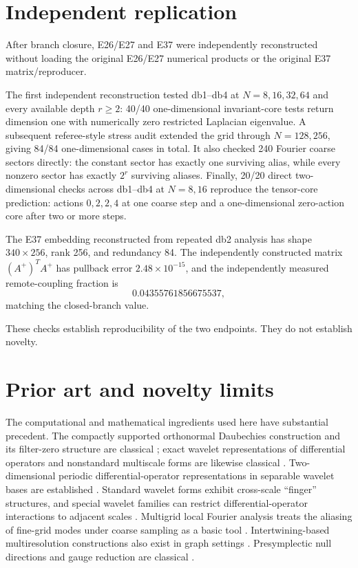 \documentclass[11pt,a4paper]{article}
\begin{document}
\section{Independent replication}
After branch closure, E26/E27 and E37 were independently reconstructed without loading the original E26/E27 numerical products or the original E37 matrix/reproducer.

The first independent reconstruction tested db1--db4 at $N=8,16,32,64$ and every available depth $r\ge2$: 40/40 one-dimensional invariant-core tests return dimension one with numerically zero restricted Laplacian eigenvalue. A subsequent referee-style stress audit extended the grid through $N=128,256$, giving 84/84 one-dimensional cases in total. It also checked 240 Fourier coarse sectors directly: the constant sector has exactly one surviving alias, while every nonzero sector has exactly $2^r$ surviving aliases. Finally, 20/20 direct two-dimensional checks across db1--db4 at $N=8,16$ reproduce the tensor-core prediction: actions $0,2,2,4$ at one coarse step and a one-dimensional zero-action core after two or more steps.

The E37 embedding reconstructed from repeated db2 analysis has shape $340\times256$, rank 256, and redundancy 84. The independently constructed matrix $(A^+)^TA^+$ has pullback error $2.48\times10^{-15}$, and the independently measured remote-coupling fraction is
\begin{equation}
0.04355761856675537,
\end{equation}
matching the closed-branch value.

These checks establish reproducibility of the two endpoints. They do not establish novelty.

\section{Prior art and novelty limits}
The computational and mathematical ingredients used here have substantial precedent. The compactly supported orthonormal Daubechies construction and its filter-zero structure are classical \cite{daubechies1988}; exact wavelet representations of differential operators and nonstandard multiscale forms are likewise classical \cite{bcr1991,beylkin1992}. Two-dimensional periodic differential-operator representations in separable wavelet bases are established \cite{wavelet2d2004}. Standard wavelet forms exhibit cross-scale ``finger'' structures, and special wavelet families can restrict differential-operator interactions to adjacent scales \cite{beylkin1997}. Multigrid local Fourier analysis treats the aliasing of fine-grid modes under coarse sampling as a basic tool \cite{trottenberg2001,kahl2020}. Intertwining-based multiresolution constructions also exist in graph settings \cite{avena2020}. Presymplectic null directions and gauge reduction are classical \cite{gotay1978}.
\end{document}
